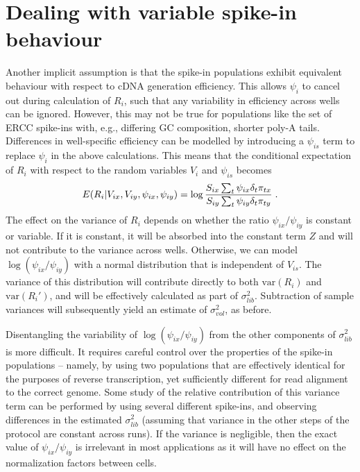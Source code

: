 \documentclass{article}
\begin{document}

\newpage
\section{Dealing with variable spike-in behaviour}
Another implicit assumption is that the spike-in populations exhibit equivalent behaviour with respect to cDNA generation efficiency.
This allows $\psi_i$ to cancel out during calculation of $R_i$, such that any variability in efficiency across wells can be ignored.
However, this may not be true for populations like the set of ERCC spike-ins with, e.g., differing GC composition, shorter poly-A tails.
Differences in well-specific efficiency can be modelled by introducing a $\psi_{is}$ term to replace $\psi_i$ in the above calculations.
This means that the conditional expectation of $R_i$ with respect to the random variables $V_{i}$ and $\psi_{is}$ becomes
\[
E(R_i | V_{ix}, V_{iy},  \psi_{ix}, \psi_{iy} ) = \log \frac{ S_{ix} \sum_t \psi_{ix}\delta_{t} \pi_{tx} } { S_{iy}\sum_t \psi_{iy}\delta_{t} \pi_{ty} } \;. \\
\]
The effect on the variance of $R_i$ depends on whether the ratio $\psi_{ix}/\psi_{iy}$ is constant or variable.
If it is constant, it will be absorbed into the constant term $Z$ and will not contribute to the variance across wells.
Otherwise, we can model $\log(\psi_{ix}/\psi_{iy})$ with a normal distribution that is independent of $V_{is}$.
The variance of this distribution will contribute directly to both $\mbox{var}(R_i)$ and $\mbox{var}(R_i')$, and will be effectively calculated as part of $\sigma^2_{lib}$.
Subtraction of sample variances will subsequently yield an estimate of $\sigma^2_{vol}$, as before.

Disentangling the variability of $\log(\psi_{ix}/\psi_{iy})$ from the other components of $\sigma^2_{lib}$ is more difficult.
It requires careful control over the properties of the spike-in populations -- namely, by using two populations that are effectively identical for the purposes of reverse transcription, yet sufficiently different for read alignment to the correct genome.
Some study of the relative contribution of this variance term can be performed by using several different spike-ins, and observing differences in the estimated $\sigma^2_{lib}$ (assuming that variance in the other steps of the protocol are constant across runs).
If the variance is negligible, then the exact value of $\psi_{ix}/\psi_{iy}$ is irrelevant in most applications as it will have no effect on the normalization factors between cells.
\end{document}
